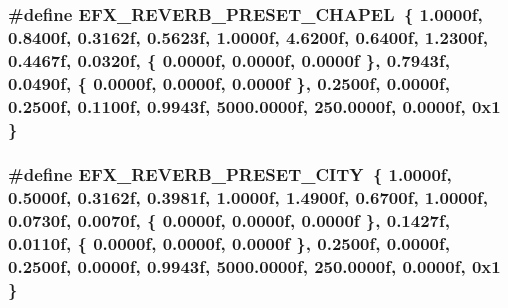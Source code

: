 \subsubsection[{\texorpdfstring{E\+F\+X\+\_\+\+R\+E\+V\+E\+R\+B\+\_\+\+P\+R\+E\+S\+E\+T\+\_\+\+C\+H\+A\+P\+EL}{EFX_REVERB_PRESET_CHAPEL}}]{\setlength{\rightskip}{0pt plus 5cm}\#define E\+F\+X\+\_\+\+R\+E\+V\+E\+R\+B\+\_\+\+P\+R\+E\+S\+E\+T\+\_\+\+C\+H\+A\+P\+EL~\{ 1.\+0000f, 0.\+8400f, 0.\+3162f, 0.\+5623f, 1.\+0000f, 4.\+6200f, 0.\+6400f, 1.\+2300f, 0.\+4467f, 0.\+0320f, \{ 0.\+0000f, 0.\+0000f, 0.\+0000f \}, 0.\+7943f, 0.\+0490f, \{ 0.\+0000f, 0.\+0000f, 0.\+0000f \}, 0.\+2500f, 0.\+0000f, 0.\+2500f, 0.\+1100f, 0.\+9943f, 5000.\+0000f, 250.\+0000f, 0.\+0000f, 0x1 \}}\hypertarget{efx-presets_8h_a60e9065d8955c7c33095c82587f815f0}{}\label{efx-presets_8h_a60e9065d8955c7c33095c82587f815f0}
\subsubsection[{\texorpdfstring{E\+F\+X\+\_\+\+R\+E\+V\+E\+R\+B\+\_\+\+P\+R\+E\+S\+E\+T\+\_\+\+C\+I\+TY}{EFX_REVERB_PRESET_CITY}}]{\setlength{\rightskip}{0pt plus 5cm}\#define E\+F\+X\+\_\+\+R\+E\+V\+E\+R\+B\+\_\+\+P\+R\+E\+S\+E\+T\+\_\+\+C\+I\+TY~\{ 1.\+0000f, 0.\+5000f, 0.\+3162f, 0.\+3981f, 1.\+0000f, 1.\+4900f, 0.\+6700f, 1.\+0000f, 0.\+0730f, 0.\+0070f, \{ 0.\+0000f, 0.\+0000f, 0.\+0000f \}, 0.\+1427f, 0.\+0110f, \{ 0.\+0000f, 0.\+0000f, 0.\+0000f \}, 0.\+2500f, 0.\+0000f, 0.\+2500f, 0.\+0000f, 0.\+9943f, 5000.\+0000f, 250.\+0000f, 0.\+0000f, 0x1 \}}\hypertarget{efx-presets_8h_acc2f97a2e86723624bff8abd909ddc0c}{}\label{efx-presets_8h_acc2f97a2e86723624bff8abd909ddc0c}
